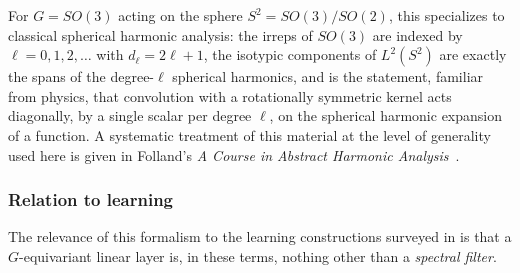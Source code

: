 \documentclass[mathematics,review,submit,moreauthors]{Definitions/mdpi}
\begin{document}
For $G = SO(3)$ acting on the sphere $S^2 = SO(3)/SO(2)$, this specializes
to classical spherical harmonic analysis: the irreps of $SO(3)$ are indexed
by $\ell = 0,1,2,\dots$ with $d_\ell = 2\ell+1$, the isotypic components of
$L^2(S^2)$ are exactly the spans of the degree-$\ell$ spherical harmonics,
and  is the statement, familiar
from physics, that convolution with a rotationally symmetric kernel acts
diagonally, by a single scalar per degree $\ell$, on the spherical harmonic
expansion of a function. A systematic treatment of this material at the
level of generality used here is given in Folland's
\emph{A Course in Abstract Harmonic Analysis}~\citep{folland2016}.

\subsubsection{Relation to learning}
\label{subsubsec:harmonic-analysis-learning}

The relevance of this formalism to the learning constructions surveyed in
 is that a $G$-equivariant linear
layer is, in these terms, nothing other than a \emph{spectral filter}.
\end{document}
